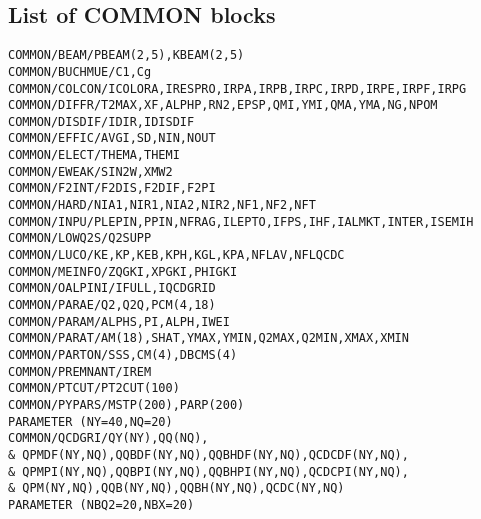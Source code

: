 \documentclass[10pt]{article} \usepackage{dina4}
\begin{document}
\subsection{List of COMMON blocks}

\verb+COMMON/BEAM/PBEAM(2,5),KBEAM(2,5)+ \\
\verb+COMMON/BUCHMUE/C1,Cg+\\
\verb+COMMON/COLCON/ICOLORA,IRESPRO,IRPA,IRPB,IRPC,IRPD,IRPE,IRPF,IRPG+\\
\verb+COMMON/DIFFR/T2MAX,XF,ALPHP,RN2,EPSP,QMI,YMI,QMA,YMA,NG,NPOM+\\
\verb+COMMON/DISDIF/IDIR,IDISDIF+\\
\verb+COMMON/EFFIC/AVGI,SD,NIN,NOUT+\\
\verb+COMMON/ELECT/THEMA,THEMI+\\
\verb+COMMON/EWEAK/SIN2W,XMW2+\\
\verb+COMMON/F2INT/F2DIS,F2DIF,F2PI+
\verb+COMMON/HARD/NIA1,NIR1,NIA2,NIR2,NF1,NF2,NFT+\\
\verb+COMMON/INPU/PLEPIN,PPIN,NFRAG,ILEPTO,IFPS,IHF,IALMKT,INTER,ISEMIH+\\
\verb+COMMON/LOWQ2S/Q2SUPP+\\
\verb+COMMON/LUCO/KE,KP,KEB,KPH,KGL,KPA,NFLAV,NFLQCDC+\\
\verb+COMMON/MEINFO/ZQGKI,XPGKI,PHIGKI+\\
\verb+COMMON/OALPINI/IFULL,IQCDGRID+\\
\verb+COMMON/PARAE/Q2,Q2Q,PCM(4,18)+\\
\verb+COMMON/PARAM/ALPHS,PI,ALPH,IWEI+\\
\verb+COMMON/PARAT/AM(18),SHAT,YMAX,YMIN,Q2MAX,Q2MIN,XMAX,XMIN+\\
\verb+COMMON/PARTON/SSS,CM(4),DBCMS(4)+ \\
\verb+COMMON/PREMNANT/IREM+\\
\verb+COMMON/PTCUT/PT2CUT(100)+\\
\verb+COMMON/PYPARS/MSTP(200),PARP(200)+ \\
\verb+PARAMETER (NY=40,NQ=20)+ \\
     \verb+COMMON/QCDGRI/QY(NY),QQ(NQ),+ \\
     \verb+& QPMDF(NY,NQ),QQBDF(NY,NQ),QQBHDF(NY,NQ),QCDCDF(NY,NQ),+\\
     \verb+& QPMPI(NY,NQ),QQBPI(NY,NQ),QQBHPI(NY,NQ),QCDCPI(NY,NQ),+\\
     \verb+& QPM(NY,NQ),QQB(NY,NQ),QQBH(NY,NQ),QCDC(NY,NQ)+  \\
\verb+PARAMETER (NBQ2=20,NBX=20)+\\
\end{document}
